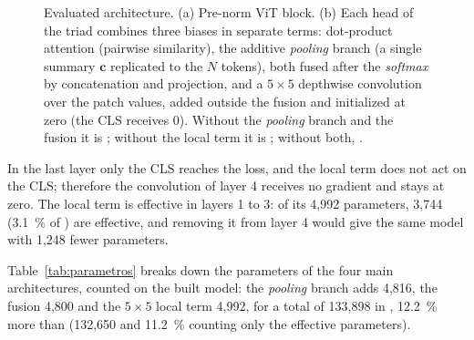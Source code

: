 \begin{figure}[!t]
\begin{anchocompleto}
\end{anchocompleto}
\caption{Evaluated architecture. (a) Pre-norm ViT block. (b) Each head of the triad  combines three biases in separate terms: dot-product attention (pairwise similarity), the additive \emph{pooling} branch (a single summary $\mathbf{c}$ replicated to the $N$ tokens), both fused after the \emph{softmax} by concatenation and projection, and a $5\times5$ depthwise convolution over the patch values, added outside the fusion and initialized at zero (the CLS receives 0). Without the \emph{pooling} branch and the fusion it is ; without the local term it is ; without both, .}
\label{fig:triada}
\end{figure}

In the last layer only the CLS reaches the loss, and the local term does not act on the CLS; therefore the convolution of layer 4 receives no gradient and stays at zero. The local term is effective in layers 1 to 3: of its 4,992 parameters, 3,744 (3.1~\% of ) are effective, and removing it from layer 4 would give the same model with 1,248 fewer parameters.

Table~\ref{tab:parametros} breaks down the parameters of the four main architectures, counted on the built model: the \emph{pooling} branch adds 4,816, the fusion 4,800 and the $5\times5$ local term 4,992, for a total of 133,898 in , 12.2~\% more than  (132,650 and 11.2~\% counting only the effective parameters).


